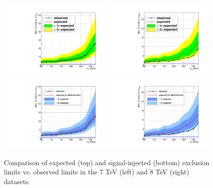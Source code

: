 \begin{figure}
\begin{center}
  \includegraphics[width=0.49\textwidth]{4_Analisys/pics/limits/vhtt_wh/vhtt_wh_7TeV.pdf}
  \includegraphics[width=0.49\textwidth]{4_Analisys/pics/limits/vhtt_wh/vhtt_wh_8TeV.pdf}\\
  \includegraphics[width=0.49\textwidth]{4_Analisys/pics/limits/vhtt_wh/vhtt_wh_injected_7TeV.pdf}
  \includegraphics[width=0.49\textwidth]{4_Analisys/pics/limits/vhtt_wh/vhtt_wh_injected_8TeV.pdf}\\
  \caption{Comparison of expected (top) and signal-injected (bottom) exclusion limits vs. observed limits in the 7 TeV (left) and 8 TeV (right) datasets. }
  \label{fig:llt_limits_78TeV}
\end{center}
\end{figure}

